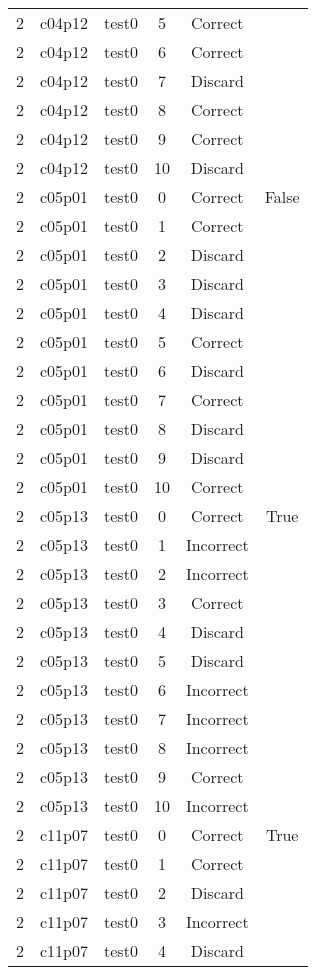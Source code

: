 \begin{longtable}{|c|c|c|c|c|c|}
2 & c04p12 & test0 & 5 & Correct &  \\ 
2 & c04p12 & test0 & 6 & Correct &  \\ 
2 & c04p12 & test0 & 7 & Discard &  \\ 
2 & c04p12 & test0 & 8 & Correct &  \\ 
2 & c04p12 & test0 & 9 & Correct &  \\ 
2 & c04p12 & test0 & 10 & Discard &  \\ 
2 & c05p01 & test0 & 0 & Correct & False \\ 
2 & c05p01 & test0 & 1 & Correct &  \\ 
2 & c05p01 & test0 & 2 & Discard &  \\ 
2 & c05p01 & test0 & 3 & Discard &  \\ 
2 & c05p01 & test0 & 4 & Discard &  \\ 
2 & c05p01 & test0 & 5 & Correct &  \\ 
2 & c05p01 & test0 & 6 & Discard &  \\ 
2 & c05p01 & test0 & 7 & Correct &  \\ 
2 & c05p01 & test0 & 8 & Discard &  \\ 
2 & c05p01 & test0 & 9 & Discard &  \\ 
2 & c05p01 & test0 & 10 & Correct &  \\ 
2 & c05p13 & test0 & 0 & Correct & True \\ 
2 & c05p13 & test0 & 1 & Incorrect &  \\ 
2 & c05p13 & test0 & 2 & Incorrect &  \\ 
2 & c05p13 & test0 & 3 & Correct &  \\ 
2 & c05p13 & test0 & 4 & Discard &  \\ 
2 & c05p13 & test0 & 5 & Discard &  \\ 
2 & c05p13 & test0 & 6 & Incorrect &  \\ 
2 & c05p13 & test0 & 7 & Incorrect &  \\ 
2 & c05p13 & test0 & 8 & Incorrect &  \\ 
2 & c05p13 & test0 & 9 & Correct &  \\ 
2 & c05p13 & test0 & 10 & Incorrect &  \\ 
2 & c11p07 & test0 & 0 & Correct & True \\ 
2 & c11p07 & test0 & 1 & Correct &  \\ 
2 & c11p07 & test0 & 2 & Discard &  \\ 
2 & c11p07 & test0 & 3 & Incorrect &  \\ 
2 & c11p07 & test0 & 4 & Discard &  \\ 

\end{longtable}
